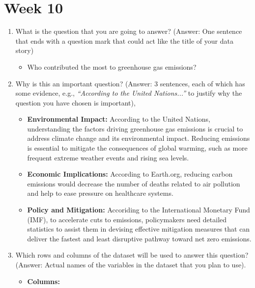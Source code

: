 \documentclass[
]{article}
\providecommand{\tightlist}{%
  \setlength{\itemsep}{0pt}\setlength{\parskip}{0pt}}
\begin{document}
\hypertarget{week-10}{%
\section{\texorpdfstring{\textbf{Week 10}}{Week 10}}\label{week-10}}

\begin{enumerate}
\def\labelenumi{\arabic{enumi}.}
\item
  What is the question that you are going to answer? (Answer: One
  sentence that ends with a question mark that could act like the title
  of your data story)

  \begin{itemize}
  \tightlist
  \item
    Who contributed the most to greenhouse gas emissions?
  \end{itemize}
\item
  Why is this an important question? (Answer: 3 sentences, each of which
  has some evidence, e.g., \emph{``According to the United Nations...''}
  to justify why the question you have chosen is important),

  \begin{itemize}
  \item
    \textbf{Environmental Impact:} According to the United Nations,
    understanding the factors driving greenhouse gas emissions is
    crucial to address climate change and its environmental impact.
    Reducing emissions is essential to mitigate the consequences of
    global warming, such as more frequent extreme weather events and
    rising sea levels.
  \item
    \textbf{Economic Implications:} According to Earth.org, reducing
    carbon emissions would decrease the number of deaths related to air
    pollution and help to ease pressure on healthcare systems.
  \item
    \textbf{Policy and Mitigation:} Accoriding to the International
    Monetary Fund (IMF), to accelerate cuts to emissions, policymakers
    need detailed statistics to assist them in devising effective
    mitigation measures that can deliver the fastest and least
    disruptive pathway toward net zero emissions.
  \end{itemize}
\item
  Which rows and columns of the dataset will be used to answer this
  question? (Answer: Actual names of the variables in the dataset that
  you plan to use).

  \begin{itemize}
  \item
    \textbf{Columns:}


\end{itemize}
\end{enumerate}
\end{document}
